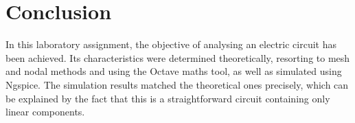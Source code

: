 \section{Conclusion}
\label{sec:conclusion}

In this laboratory assignment, the objective of analysing an electric circuit has been achieved. Its characteristics were determined theoretically, resorting to mesh and nodal methods and using the Octave maths tool, as well as simulated using Ngspice.
The simulation results matched the theoretical ones precisely, which can be explained by the fact that this is a straightforward circuit containing only linear components. 
